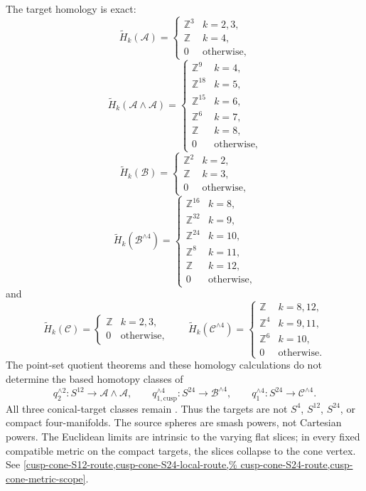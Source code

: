 \begin{auditrecord}
The target homology is exact:
\[
 \widetilde H_k(\mathcal A)=
 \begin{cases}\mathbb Z^3&k=2,3,\\\mathbb Z&k=4,\\0&\text{otherwise},\end{cases}
\]
\[
 \widetilde H_k(\mathcal A\wedge\mathcal A)=
 \begin{cases}
 \mathbb Z^9&k=4,\\\mathbb Z^{18}&k=5,\\
 \mathbb Z^{15}&k=6,\\\mathbb Z^6&k=7,\\\mathbb Z&k=8,\\
 0&\text{otherwise},
 \end{cases}
\]
\[
 \widetilde H_k(\mathcal B)=
 \begin{cases}\mathbb Z^2&k=2,\\\mathbb Z&k=3,\\0&\text{otherwise},\end{cases}
\]
\[
 \widetilde H_k(\mathcal B^{\wedge4})=
 \begin{cases}
 \mathbb Z^{16}&k=8,\\\mathbb Z^{32}&k=9,\\
 \mathbb Z^{24}&k=10,\\\mathbb Z^8&k=11,\\\mathbb Z&k=12,\\
 0&\text{otherwise},
 \end{cases}
\]
and
\[
 \widetilde H_k(\mathcal C)=
 \begin{cases}\mathbb Z&k=2,3,\\0&\text{otherwise},\end{cases}
 \qquad
\widetilde H_k(\mathcal C^{\wedge4})=
 \begin{cases}
 \mathbb Z&k=8,12,\\\mathbb Z^4&k=9,11,\\
 \mathbb Z^6&k=10,\\0&\text{otherwise}.
 \end{cases}
\]
The point-set quotient theorems and these homology calculations do not
determine the based homotopy classes of
\[
 q_2^{\wedge2}:S^{12}\longrightarrow\mathcal A\wedge\mathcal A,\qquad
 q_{1,\mathrm{cusp}}^{\wedge4}:S^{24}\longrightarrow\mathcal B^{\wedge4},
 \qquad
 q_1^{\wedge4}:S^{24}\longrightarrow\mathcal C^{\wedge4}.
\]
All three conical-target classes remain \Open.
Thus the targets are not \(S^4\), \(S^{12}\), \(S^{24}\), or compact
four-manifolds.  The source spheres are smash powers, not Cartesian powers.
The Euclidean limits are intrinsic to the varying flat slices; in every
fixed compatible metric on the compact targets, the slices collapse to the
cone vertex.  See
\cref{cusp-cone-S12-route,cusp-cone-S24-local-route,%
cusp-cone-S24-route,cusp-cone-metric-scope}.
\end{auditrecord}


